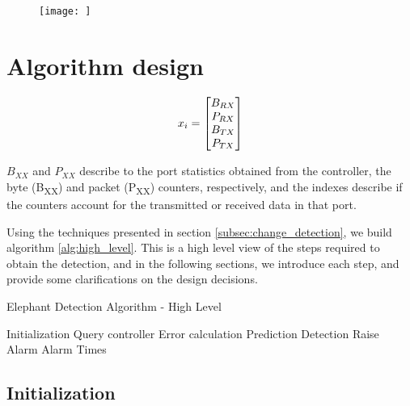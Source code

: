 \begin{figure} 
    \centering
    \texttt{[image: ]}
    \caption {}
    \label{fig:ovs_packet_loss}
\end{figure} 

\section {Algorithm design}

\begin {equation*}
\centering
x_i = 
\begin{bmatrix}
B_{RX}\\
P_{RX}\\
B_{TX}\\
P_{TX}\\
\end{bmatrix}
\end {equation*}

\par $B_{XX}$ and $P_{XX}$ describe to the port statistics obtained from the controller, the byte (B\textsubscript{XX}) and packet (P\textsubscript{XX}) counters, respectively, and the indexes describe if the counters
account for the transmitted or received data in that port.

\par Using the techniques presented in section \ref{subsec:change_detection}, we build algorithm \ref{alg:high_level}. This is a high level view of the steps required to obtain the detection, and in the following sections,
we introduce each step, and provide some clarifications on the design decisions.

\begin{algorithm}[H]
    \caption{Elephant Detection Algorithm - High Level} \label{alg:high_level}
    \begin{algorithmic}[1]
            \State Initialization
            \State Query controller
            \Loop
                \State Error calculation
                \State Prediction
                \State Detection
                    \State Raise Alarm
                \EndIf
            \EndLoop
        \EndProcedure 
        \State \Return Alarm Times
    \end{algorithmic}
\end{algorithm}

\subsection{Initialization}

